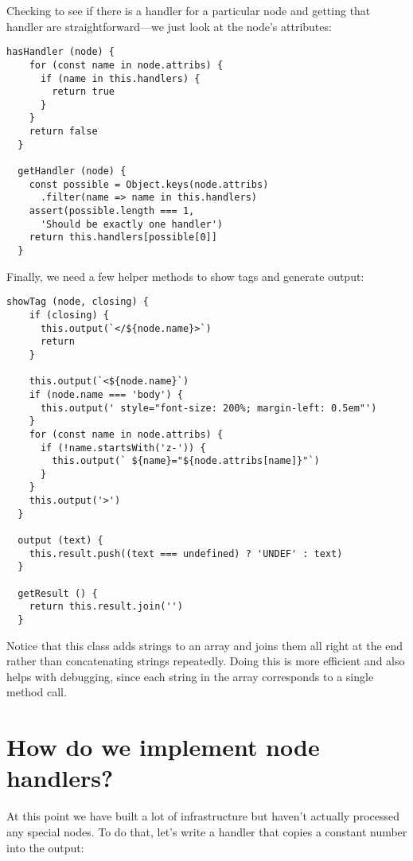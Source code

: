 \documentclass[krantzl]{krantz}
\begin{document}
Checking to see if there is a handler for a particular node
and getting that handler are straightforward---we just
look at the node's attributes:


\begin{lstlisting}[frame=single,frameround=tttt]
  hasHandler (node) {
    for (const name in node.attribs) {
      if (name in this.handlers) {
        return true
      }
    }
    return false
  }

  getHandler (node) {
    const possible = Object.keys(node.attribs)
      .filter(name => name in this.handlers)
    assert(possible.length === 1,
      'Should be exactly one handler')
    return this.handlers[possible[0]]
  }
\end{lstlisting}



Finally, we need a few helper methods to show tags and generate output:


\begin{lstlisting}[frame=single,frameround=tttt]
  showTag (node, closing) {
    if (closing) {
      this.output(`</${node.name}>`)
      return
    }

    this.output(`<${node.name}`)
    if (node.name === 'body') {
      this.output(' style="font-size: 200%; margin-left: 0.5em"')
    }
    for (const name in node.attribs) {
      if (!name.startsWith('z-')) {
        this.output(` ${name}="${node.attribs[name]}"`)
      }
    }
    this.output('>')
  }

  output (text) {
    this.result.push((text === undefined) ? 'UNDEF' : text)
  }

  getResult () {
    return this.result.join('')
  }
\end{lstlisting}



\noindent Notice that this class adds strings to an array and joins them all right at the end
rather than concatenating strings repeatedly.
Doing this is more efficient and also helps with debugging,
since each string in the array corresponds to a single method call.

\section{How do we implement node handlers?}\label{page-templates-handlers}


At this point
we have built a lot of infrastructure but haven't actually processed any special nodes.
To do that,
let's write a handler that copies a constant number into the output:
\end{document}

